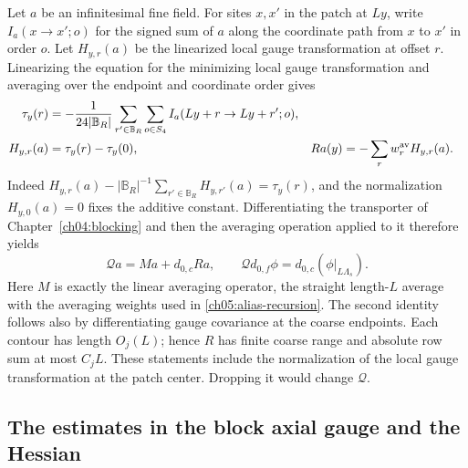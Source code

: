 Let $a$ be an infinitesimal fine field. For sites $x,x'$ in the patch
at $Ly$, write $I_a(x\to x';o)$ for the signed sum of $a$ along the
coordinate path from $x$ to $x'$ in order $o$. Let $H_{y,r}(a)$ be the
linearized local gauge transformation at offset $r$. Linearizing the equation for the minimizing local gauge transformation and
averaging over the endpoint and coordinate order gives
\begin{align}
 \tau_y(r)&=-\frac1{24|\mathbb B_R|}\sum_{r'\in\mathbb B_R}\sum_{o\in S_4}
 I_a(Ly+r\to Ly+r';o),\notag\\
 H_{y,r}(a)&=\tau_y(r)-\tau_y(0),&
 R a(y)&=-\sum_rw_r^{\rm av}H_{y,r}(a).
 \label{ch05:frame-linearization}
\end{align}
Indeed $H_{y,r}(a)-|\mathbb B_R|^{-1}\sum_{r'\in\mathbb B_R}H_{y,r'}(a)
=\tau_y(r)$, and the normalization $H_{y,0}(a)=0$ fixes the additive
constant. Differentiating the transporter of Chapter~\ref{ch04:blocking} and then the averaging operation applied to it
therefore yields
\begin{equation}
 \mathcal Q a=M a+d_{0,c}R a,
 \qquad \mathcal Q d_{0,f}\phi=d_{0,c}(\phi|_{L\Lambda_s}).
 \label{ch05:actual-Q}
\end{equation}
Here $M$ is exactly the linear averaging operator, the straight length-$L$ average with the averaging
weights used in \eqref{ch05:alias-recursion}. The second identity follows
also by differentiating gauge covariance at the coarse endpoints. Each contour has
length $O_j(L)$; hence $R$ has finite coarse range and absolute row sum
at most $C_jL$. These statements include the normalization of the local gauge transformation at the patch center. Dropping
it would change $\mathcal Q$.

\subsection{The estimates in the block axial gauge and the Hessian}

